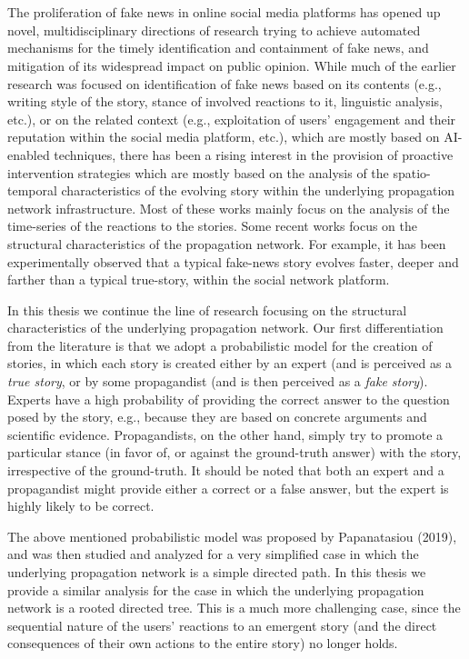 \chapter*{\abstractname}
\addstarredchapter{\abstractname} %
\makecseabstract

The proliferation of fake news in online social media platforms has opened up novel, multidisciplinary directions of research trying to achieve automated mechanisms for the timely identification and containment of fake news, and mitigation of its widespread impact on public opinion. While much of the earlier research was focused on identification of fake news based on its contents (e.g., writing style of the story, stance of involved reactions to it, linguistic analysis, etc.), or on the related context (e.g., exploitation of users’ engagement and their reputation within the social media platform, etc.), which are mostly based on AI-enabled techniques, there has been a rising interest in the provision of proactive intervention strategies which are mostly based on the analysis of the spatio-temporal characteristics of the evolving story within the underlying propagation network infrastructure. Most of these works mainly focus on the analysis of the time-series of the reactions to the stories. Some recent works focus on the structural characteristics of the propagation network. For example, it has been experimentally observed that a typical fake-news story evolves faster, deeper and farther than a typical true-story, within the social network platform.


In this thesis we continue the line of research focusing on the structural characteristics of the underlying propagation network. Our first differentiation from the literature is that we adopt a probabilistic model for the creation of stories, in which each story is created either by an expert (and is perceived as a \emph{true story}, or by some propagandist (and is then perceived as a \emph{fake story}). Experts have a high probability of providing the correct answer to the question posed by the story, e.g., because they are based on concrete arguments and scientific evidence. Propagandists, on the other hand, simply try to promote a particular stance (in favor of, or against the ground-truth answer) with the story, irrespective of the ground-truth. It should be noted that both an expert and a propagandist might provide either a correct or a false answer, but the expert is highly likely to be correct.


The above mentioned probabilistic model was proposed by Papanatasiou (2019), and was then studied and analyzed for a very simplified case in which the underlying propagation network is a simple directed path. In this thesis we provide a similar analysis for the case in which the underlying propagation network is a rooted directed tree. This is a much more challenging case, since the sequential nature of the users' reactions to an emergent story (and the direct consequences of their own actions to the entire story) no longer holds.


